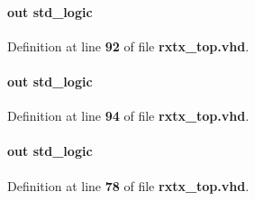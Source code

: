 \paragraph[{wfm\+\_\+mem\+\_\+ras\+\_\+n}]{ {\bfseries \textcolor{keywordflow}{out}\textcolor{vhdlchar}{ }} {\bfseries \textcolor{comment}{std\+\_\+logic}\textcolor{vhdlchar}{ }} \hspace{0.3cm}{\ttfamily [Port]}}\label{classrxtx__top_a000c91f0db53e8483d5055cd3d7edcdd}


Definition at line {\bf 92} of file {\bf rxtx\+\_\+top.\+vhd}.

\paragraph[{wfm\+\_\+mem\+\_\+we\+\_\+n}]{ {\bfseries \textcolor{keywordflow}{out}\textcolor{vhdlchar}{ }} {\bfseries \textcolor{comment}{std\+\_\+logic}\textcolor{vhdlchar}{ }} \hspace{0.3cm}{\ttfamily [Port]}}\label{classrxtx__top_a0d26ddfc07de1714029d78e673d2805d}


Definition at line {\bf 94} of file {\bf rxtx\+\_\+top.\+vhd}.

\paragraph[{wfm\+\_\+phy\+\_\+clk}]{ {\bfseries \textcolor{keywordflow}{out}\textcolor{vhdlchar}{ }} {\bfseries \textcolor{comment}{std\+\_\+logic}\textcolor{vhdlchar}{ }} \hspace{0.3cm}{\ttfamily [Port]}}\label{classrxtx__top_ac2c6bf0f19c2dcbc0309af466acc50e7}


Definition at line {\bf 78} of file {\bf rxtx\+\_\+top.\+vhd}.

